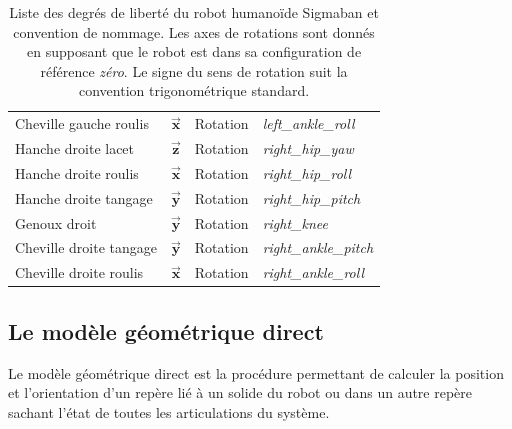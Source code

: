 \begin{table}[htb]
\begin{center}
\begin{tabular}{|l|c|c|l|}
        Cheville gauche roulis & $\vec{\bm{x}}$ & Rotation & \textit{left\_ankle\_roll} \\
        Hanche droite lacet & $\vec{\bm{z}}$ & Rotation & \textit{right\_hip\_yaw} \\
        Hanche droite roulis & $\vec{\bm{x}}$ & Rotation & \textit{right\_hip\_roll} \\
        Hanche droite tangage & $\vec{\bm{y}}$ & Rotation & \textit{right\_hip\_pitch} \\
        Genoux droit & $\vec{\bm{y}}$ & Rotation & \textit{right\_knee} \\
        Cheville droite tangage & $\vec{\bm{y}}$ & Rotation & \textit{right\_ankle\_pitch} \\
        Cheville droite roulis & $\vec{\bm{x}}$ & Rotation & \textit{right\_ankle\_roll} \\
        \hline
    \end{tabular}
    \caption{\label{tab:dofs}Liste des degrés de liberté du robot 
    humanoïde Sigmaban et convention de nommage. 
    Les axes de rotations sont donnés en supposant que le robot 
    est dans sa configuration de référence \textit{zéro}. 
    Le signe du sens de rotation suit la convention trigonométrique standard.}
\end{center}
\end{table}

\subsection{Le modèle géométrique direct \label{sec:modele_direct}}

Le modèle géométrique direct est la procédure permettant de calculer
la position et l'orientation
d'un repère lié à un solide du robot ou 
dans un autre repère sachant l'état de toutes les articulations du système.

